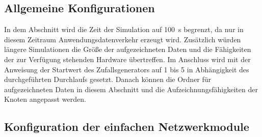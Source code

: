 \subsection{Allgemeine Konfigurationen}
In dem Abschnitt \ini{[General]} wird die Zeit der Simulation auf \SI{100}{\second}  begrenzt, da nur in diesem Zeitraum Anwendungsdatenverkehr erzeugt wird. Zusätzlich würden längere Simulationen die Größe der aufgezeichneten Daten und die Fähigkeiten der zur Verfügung stehenden Hardware übertreffen. Im Anschluss wird mit der Anweisung  der Startwert des Zufallsgenerators auf 1 bis 5 in Abhängigkeit des durchgeführten Durchlaufs gesetzt. Danach können die Ordner für aufgezeichneten Daten in diesem Abschnitt und die Aufzeichnungsfähigkeiten der Knoten angepasst werden.

\subsection{Konfiguration der einfachen Netzwerkmodule}
